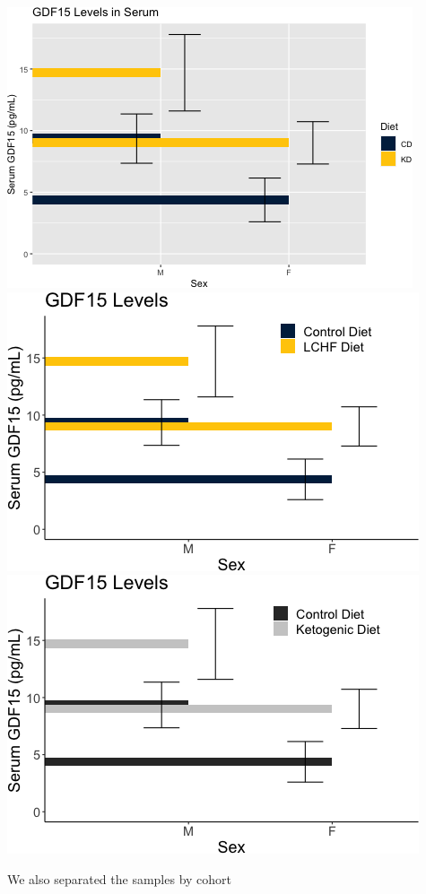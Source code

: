 \documentclass[]{article}
\begin{document}
\includegraphics{figures/kd-gdf15-barplots-1.png}
\includegraphics{figures/kd-gdf15-barplots-2.png}
\includegraphics{figures/kd-gdf15-barplots-3.png}

We also separated the samples by cohort
\end{document}
